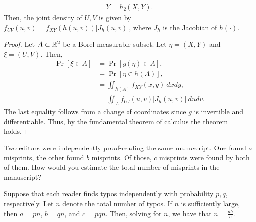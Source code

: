 \begin{solution}
\begin{theorem}
\begin{align*}
            Y = h_2(X,Y).
        \end{align*}
        Then, the joint density of $U,V$ is given by $f_{UV}(u,v) = f_{XY}(h(u,v))|J_h(u,v)|$, where $J_h$ is the Jacobian of $h(\cdot)$. 
    \end{theorem}
    \begin{proof}
        Let $A \subset \mathbb{R}^2$ be a Borel-measurable subset. Let $\eta = (X,Y)$ and $\xi = (U,V)$. Then,
        \begin{align*}
            \Pr[\xi \in A] &= \Pr[g(\eta) \in A], \\
            &= \Pr[\eta \in h(A)], \\
            &= \iint_{h(A)} f_{XY}(x,y)~dxdy, \\
            &= \iint_{A} f_{UV}(u,v)|J_h(u,v)|~dudv.
        \end{align*}
    The last equality follows from a change of coordinates since $g$ is invertible and differentiable. Thus, by the fundamental theorem of calculus the theorem holds.
    \end{proof}
\end{solution}

\begin{problem}{9}
    Two editors were independently proof-reading the same manuscript. One found $a$ misprints, the other found $b$ misprints. Of those, $c$ misprints were found by both of them. How would you estimate the total number of misprints in the manuscript?
\end{problem}
\begin{solution}
    Suppose that each reader finds typos independently with probability $p, q$, respectively. Let $n$ denote the total number of typos. If $n$ is sufficiently large, then $a = pn$, $b = qn$, and $c = pqn$. Then, solving for $n$, we have that $n = \frac{ab}{c}$. 
\end{solution}


